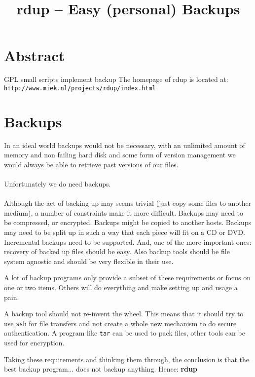 \documentclass{article}
\newcommand{\rdup}{\textbf{rdup}}
\newcommand{\cmd}[1]{\texttt{#1}}
\newcommand{\url}[1]{\texttt{#1}}
\begin{document}
\pagestyle{empty}

\title{\rdup{} -- Easy (personal) Backups}
\date{}
\maketitle
\thispagestyle{empty}

\section*{Abstract}
GPL 
small
scripts implement backup 
The homepage of rdup is located at: 
\url{http://www.miek.nl/projects/rdup/index.html}



\section*{Backups}
In an ideal world backups would not be necessary, with an unlimited
amount of memory and non failing hard disk and some form of version
management we would always be able to retrieve past versions of our files.
\paragraph{}
Unfortunately we do need backups.
\paragraph{}
Although the act of backing up may seems trivial (just copy some files
to another medium), a number of constraints make it more difficult. 
Backups may need to be compressed, or encrypted. Backups might be copied
to another hosts. Backups may need to be split up in such a way that
each piece will fit on a CD or DVD. Incremental backups need to be
supported. And, one of the more important ones: recovery of backed up
files should be easy.  Also backup tools should be file system agnostic
and should be very flexible in their use.

A lot of backup programs only provide a subset of these requirements or
focus on one or two items. Others will do everything and make setting up
and usage a pain.

A backup tool should not re-invent the wheel.  This means that it should
try to use \cmd{ssh} for file transfers and not create a whole new
mechanism to do secure authentication. A program like \cmd{tar} can be
used to pack files, other tools can be used for encryption. 

Taking these requirements and thinking them through, the
conclusion is that the best backup program... does not backup anything.
Hence: \rdup
\end{document}
